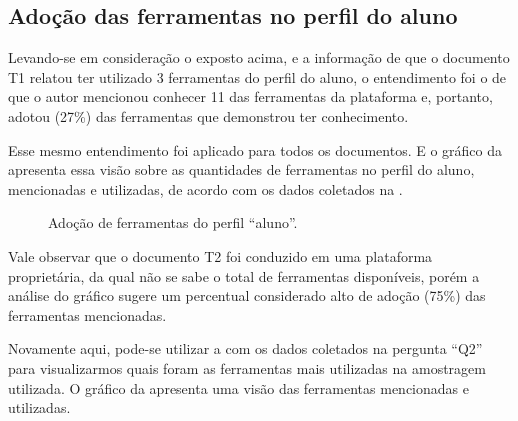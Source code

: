 \subsection{Adoção das ferramentas no perfil do aluno}%
Levando-se em consideração o exposto acima, e a informação de que o documento T1 relatou ter utilizado 3 ferramentas do perfil do aluno, o entendimento foi o de que o autor mencionou conhecer 11 das ferramentas da plataforma e, portanto, adotou (27\%) das ferramentas que demonstrou ter conhecimento. 

Esse mesmo entendimento foi aplicado para todos os documentos. E o gráfico da  apresenta essa visão sobre as quantidades de ferramentas no perfil do aluno, mencionadas e utilizadas, de acordo com os dados coletados na .

\begin{figure}[ht!]
    \centering
    \label{fig:ferram_aluno}
    \caption{Adoção de ferramentas do perfil ``aluno''.}
    \vspace{2mm}
    \vspace{2mm}
\end{figure}

Vale observar que o documento T2 foi conduzido em uma plataforma proprietária, da qual não se sabe o total de ferramentas disponíveis, porém a análise do gráfico sugere um percentual considerado alto de adoção (75\%) das ferramentas mencionadas. 

Novamente aqui, pode-se utilizar a  com os dados coletados na pergunta ``Q2'' para visualizarmos quais foram as ferramentas mais utilizadas na amostragem utilizada. O gráfico da  apresenta uma visão das ferramentas mencionadas e utilizadas.

